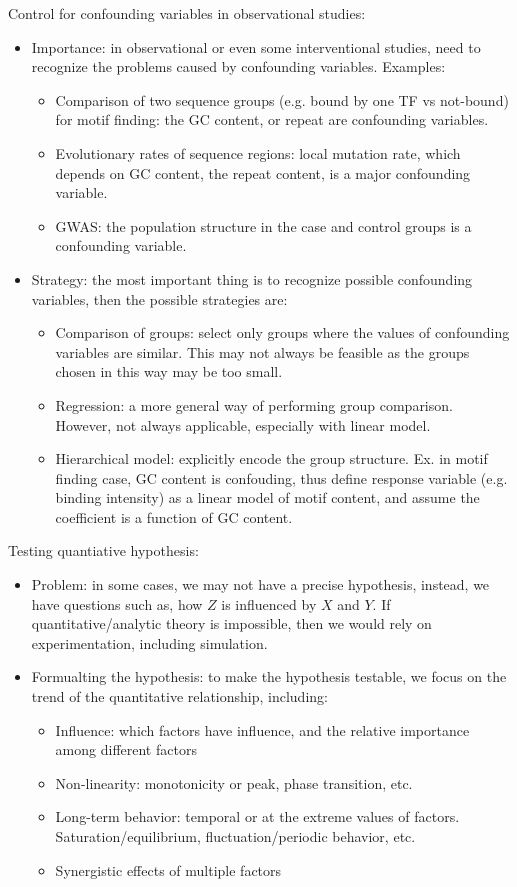 \documentclass{report}
\begin{document}
Control for confounding variables in observational studies: 
\begin{itemize}
\item Importance: in observational or even some interventional studies, need to recognize the problems caused by confounding variables. Examples: 
\begin{itemize}
	\item Comparison of two sequence groups (e.g. bound by one TF vs not-bound) for motif finding: the GC content, or repeat are confounding variables. 
	\item Evolutionary rates of sequence regions: local mutation rate, which depends on GC content, the repeat content, is a major confounding variable.
	\item GWAS: the population structure in the case and control groups is a confounding variable. 
\end{itemize}

\item Strategy: the most important thing is to recognize possible confounding variables, then the possible strategies are: 
\begin{itemize}
	\item Comparison of groups: select only groups where the values of confounding variables are similar. This may not always be feasible as the groups chosen in this way may be too small. 
	\item Regression: a more general way of performing group comparison. However, not always applicable, especially with linear model. 
	\item Hierarchical model: explicitly encode the group structure. Ex. in motif finding case, GC content is confouding, thus define response variable (e.g. binding intensity) as a linear model of motif content, and assume the coefficient is a function of GC content. 
\end{itemize}
\end{itemize}

Testing quantiative hypothesis: 
\begin{itemize}
\item Problem: in some cases, we may not have a precise hypothesis, instead, we have questions such as, how $Z$ is influenced by $X$ and $Y$. If quantitative/analytic theory is impossible, then we would rely on experimentation, including simulation. 

\item Formualting the hypothesis: to make the hypothesis testable, we focus on the trend of the quantitative relationship, including: 
\begin{itemize}
	\item Influence: which factors have influence, and the relative importance among different factors
	\item Non-linearity: monotonicity or peak, phase transition, etc. 
	\item Long-term behavior: temporal or at the extreme values of factors. Saturation/equilibrium, fluctuation/periodic behavior, etc. 
	\item Synergistic effects of multiple factors
\end{itemize}
\end{itemize}
\end{document}
